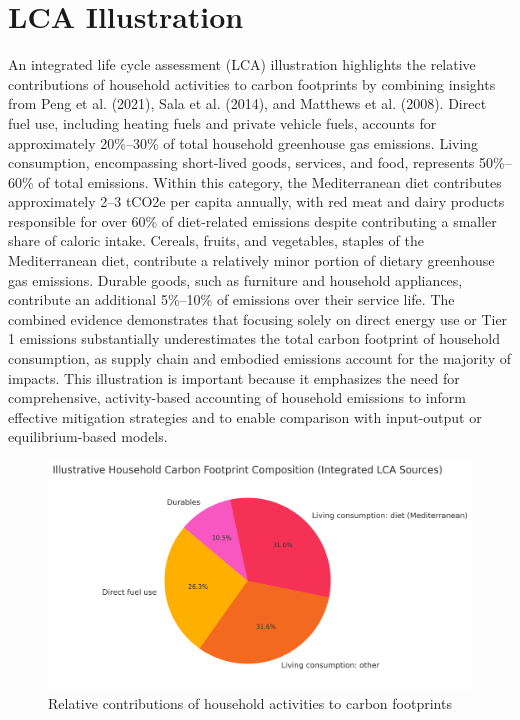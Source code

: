 \documentclass[12pt,a4paper]{article}
\begin{document}
\section{LCA Illustration}

An integrated life cycle assessment (LCA) illustration highlights the relative contributions of household activities to carbon footprints by combining insights from Peng et al. (2021), Sala et al. (2014), and Matthews et al. (2008). Direct fuel use, including heating fuels and private vehicle fuels, accounts for approximately 20\%–30\% of total household greenhouse gas emissions. Living consumption, encompassing short-lived goods, services, and food, represents 50\%–60\% of total emissions. Within this category, the Mediterranean diet contributes approximately 2–3 tCO2e per capita annually, with red meat and dairy products responsible for over 60\% of diet-related emissions despite contributing a smaller share of caloric intake. Cereals, fruits, and vegetables, staples of the Mediterranean diet, contribute a relatively minor portion of dietary greenhouse gas emissions. Durable goods, such as furniture and household appliances, contribute an additional 5\%–10\% of emissions over their service life. The combined evidence demonstrates that focusing solely on direct energy use or Tier 1 emissions substantially underestimates the total carbon footprint of household consumption, as supply chain and embodied emissions account for the majority of impacts. This illustration is important because it emphasizes the need for comprehensive, activity-based accounting of household emissions to inform effective mitigation strategies and to enable comparison with input-output or equilibrium-based models.
\begin{figure}[h]
\centering
\includegraphics[width=0.8\linewidth]{LCA_pie_chart.png}
\caption{Relative contributions of household activities to carbon footprints}
\end{figure}
\end{document}
